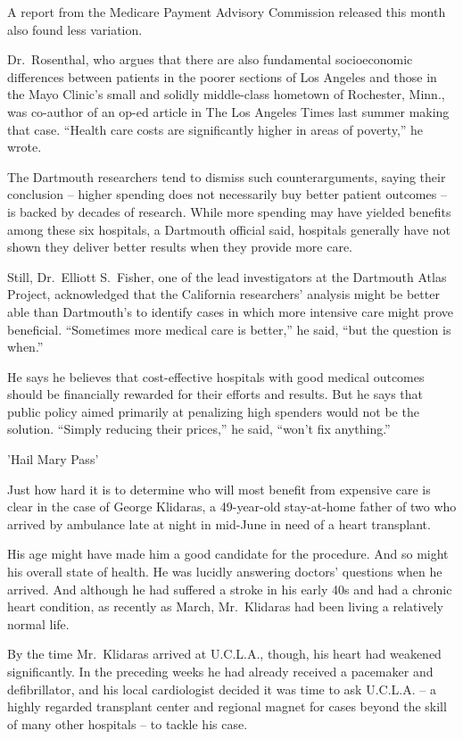 ﻿\documentclass[12pt]{article}
\begin{document}
A report from the Medicare Payment Advisory Commission released this month also found less
variation.

Dr.~Rosenthal, who argues that there are also fundamental socioeconomic differences between patients
in the poorer sections of Los Angeles and those in the Mayo Clinic's small and solidly middle-class
hometown of Rochester, Minn., was co-author of an op-ed article in The Los Angeles Times last summer
making that case. ``Health care costs are significantly higher in areas of poverty,'' he wrote.

The Dartmouth researchers tend to dismiss such counterarguments, saying their conclusion -- higher
spending does not necessarily buy better patient outcomes -- is backed by decades of research. While
more spending may have yielded benefits among these six hospitals, a Dartmouth official said,
hospitals generally have not shown they deliver better results when they provide more care.

Still, Dr.~Elliott S.~Fisher, one of the lead investigators at the Dartmouth Atlas Project,
acknowledged that the California researchers' analysis might be better able than Dartmouth's to
identify cases in which more intensive care might prove beneficial. ``Sometimes more medical care is
better,'' he said, ``but the question is when.''

He says he believes that cost-effective hospitals with good medical outcomes should be financially
rewarded for their efforts and results. But he says that public policy aimed primarily at penalizing
high spenders would not be the solution. ``Simply reducing their prices,'' he said, ``won't fix
anything.''

'Hail Mary Pass'

Just how hard it is to determine who will most benefit from expensive care is clear in the case of
George Klidaras, a 49-year-old stay-at-home father of two who arrived by ambulance late at night in
mid-June in need of a heart transplant.

His age might have made him a good candidate for the procedure. And so might his overall state of
health. He was lucidly answering doctors' questions when he arrived. And although he had suffered a
stroke in his early 40s and had a chronic heart condition, as recently as March, Mr.~Klidaras had
been living a relatively normal life.

By the time Mr.~Klidaras arrived at U.C.L.A., though, his heart had weakened significantly. In the
preceding weeks he had already received a pacemaker and defibrillator, and his local cardiologist
decided it was time to ask U.C.L.A. -- a highly regarded transplant center and regional magnet for
cases beyond the skill of many other hospitals -- to tackle his case.
\end{document}
